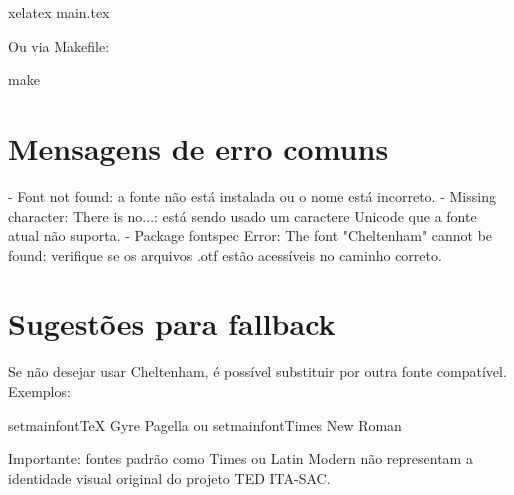 xelatex main.tex

Ou via Makefile:

make

\section{Mensagens de erro comuns}

- Font not found: a fonte não está instalada ou o nome está incorreto.
- Missing character: There is no...: está sendo usado um caractere Unicode que a fonte atual não suporta.
- Package fontspec Error: The font "Cheltenham" cannot be found: verifique se os arquivos .otf estão acessíveis no caminho correto.

\section{Sugestões para fallback}

Se não desejar usar Cheltenham, é possível substituir por outra fonte compatível. Exemplos:

setmainfont{TeX Gyre Pagella}  
ou  
setmainfont{Times New Roman}

Importante: fontes padrão como Times ou Latin Modern não representam a identidade visual original do projeto TED ITA-SAC.
